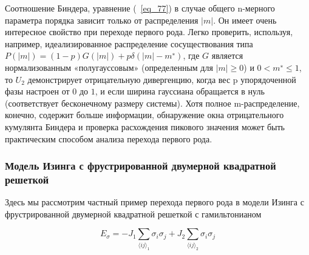 \documentclass[11pt]{article}
\begin{document}
Соотношение Биндера, уравнение (~\ref{eq_77}) в случае общего n-мерного параметра порядка зависит только от распределения $|m|$. Он имеет очень интересное свойство при переходе первого рода. Легко проверить, используя, например, идеализированное распределение сосуществования типа $P(|m|) = (1 - p) G (| m |) + p\delta (| m | - m^{∗})$, где $G$ является нормализованным «полугауссовым» (определенным для $| m | ≥ 0$) и $0 <m^{∗} ≤ 1$, то $U_2$ демонстрирует отрицательную дивергенцию, когда вес p упорядоченной фазы настроен от $0$ до $1$, и если ширина гауссиана обращается в нуль (соответствует бесконечному размеру системы). Хотя полное m-распределение, конечно, содержит больше информации, обнаружение окна отрицательного кумулянта Биндера и проверка расхождения пикового значения может быть практическим способом анализа перехода первого рода.

\subsubsection{Модель Изинга с фрустрированной двумерной квадратной решеткой}
Здесь мы рассмотрим частный пример перехода первого рода в модели Изинга с фрустрированной двумерной квадратной решеткой с гамильтонианом

\begin{equation}
E_\sigma = -J_1\sum\limits_{\langle ij \rangle _1} \sigma_i \sigma_j + J_2\sum\limits_{\langle ij \rangle _2}\sigma_i \sigma_j
\label{eq_79}
\end{equation}
\end{document}
